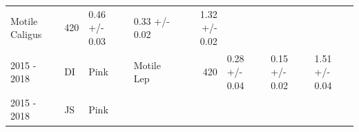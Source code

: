 \documentclass[fleqn,10pt]{wlpeerj} %
\begin{document}
\begin{longtable}[]{@{}llllrlll@{}}
\begin{minipage}[t]{0.11\columnwidth}
Motile Caligus\strut
\end{minipage} & \begin{minipage}[t]{0.04\columnwidth}\raggedleft\strut
420\strut
\end{minipage} & \begin{minipage}[t]{0.14\columnwidth}\raggedright\strut
0.46 +/- 0.03\strut
\end{minipage} & \begin{minipage}[t]{0.14\columnwidth}\raggedright\strut
0.33 +/- 0.02\strut
\end{minipage} & \begin{minipage}[t]{0.14\columnwidth}\raggedright\strut
1.32 +/- 0.02\strut
\end{minipage}\tabularnewline
\begin{minipage}[t]{0.09\columnwidth}\raggedright\strut
2015 - 2018\strut
\end{minipage} & \begin{minipage}[t]{0.06\columnwidth}\raggedright\strut
DI\strut
\end{minipage} & \begin{minipage}[t]{0.06\columnwidth}\raggedright\strut
Pink\strut
\end{minipage} & \begin{minipage}[t]{0.11\columnwidth}\raggedright\strut
Motile Lep\strut
\end{minipage} & \begin{minipage}[t]{0.04\columnwidth}\raggedleft\strut
420\strut
\end{minipage} & \begin{minipage}[t]{0.14\columnwidth}\raggedright\strut
0.28 +/- 0.04\strut
\end{minipage} & \begin{minipage}[t]{0.14\columnwidth}\raggedright\strut
0.15 +/- 0.02\strut
\end{minipage} & \begin{minipage}[t]{0.14\columnwidth}\raggedright\strut
1.51 +/- 0.04\strut
\end{minipage}\tabularnewline
\begin{minipage}[t]{0.09\columnwidth}\raggedright\strut
2015 - 2018\strut
\end{minipage} & \begin{minipage}[t]{0.06\columnwidth}\raggedright\strut
JS\strut
\end{minipage} & \begin{minipage}[t]{0.06\columnwidth}\raggedright\strut
Pink\strut
\end{minipage} & \begin{minipage}[t]{0.11\columnwidth}\raggedright\strut

\end{minipage}
\end{longtable}
\end{document}
